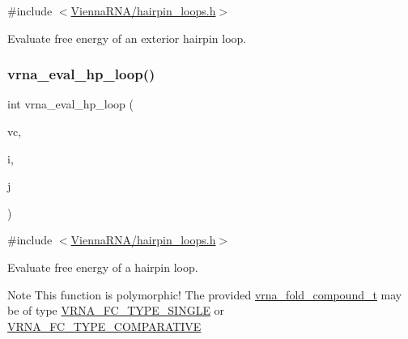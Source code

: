 {\ttfamily \#include $<$\mbox{\hyperlink{hairpin__loops_8h}{Vienna\+R\+N\+A/hairpin\+\_\+loops.\+h}}$>$}



Evaluate free energy of an exterior hairpin loop. 

\mbox{\label{group__loops_gab3eb4651dc26dc2b653a57dd340d7e68}} 
\subsubsection{\texorpdfstring{vrna\+\_\+eval\+\_\+hp\+\_\+loop()}{vrna\_eval\_hp\_loop()}}
{\footnotesize\ttfamily int vrna\+\_\+eval\+\_\+hp\+\_\+loop (\begin{DoxyParamCaption}\item[{\mbox{\hyperlink{group__fold__compound_ga1b0cef17fd40466cef5968eaeeff6166}{vrna\+\_\+fold\+\_\+compound\+\_\+t}} $\ast$}]{vc,  }\item[{int}]{i,  }\item[{int}]{j }\end{DoxyParamCaption})}



{\ttfamily \#include $<$\mbox{\hyperlink{hairpin__loops_8h}{Vienna\+R\+N\+A/hairpin\+\_\+loops.\+h}}$>$}



Evaluate free energy of a hairpin loop. 

\begin{DoxyNote}{Note}
This function is polymorphic! The provided \mbox{\hyperlink{group__fold__compound_ga1b0cef17fd40466cef5968eaeeff6166}{vrna\+\_\+fold\+\_\+compound\+\_\+t}} may be of type \mbox{\hyperlink{group__fold__compound_gga01a4ff86fa71deaaa5d1abbd95a1447da7e264dd3cf2dc9b6448caabcb7763cd6}{V\+R\+N\+A\+\_\+\+F\+C\+\_\+\+T\+Y\+P\+E\+\_\+\+S\+I\+N\+G\+LE}} or \mbox{\hyperlink{group__fold__compound_gga01a4ff86fa71deaaa5d1abbd95a1447dab821ce46ea3cf665be97df22a76f5023}{V\+R\+N\+A\+\_\+\+F\+C\+\_\+\+T\+Y\+P\+E\+\_\+\+C\+O\+M\+P\+A\+R\+A\+T\+I\+VE}}
\end{DoxyNote}

